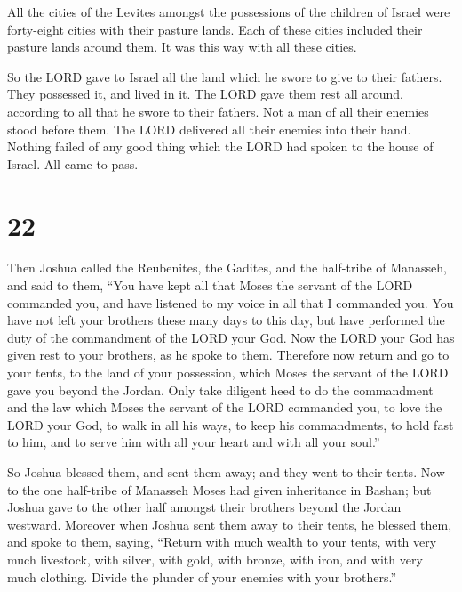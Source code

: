  All the cities of the Levites amongst the possessions of
the children of Israel were forty-eight cities with their pasture lands.
 Each of these cities included their pasture lands around
them. It was this way with all these cities.

 So the LORD gave to Israel all the land which he swore
to give to their fathers. They possessed it, and lived in it.
 The LORD gave them rest all around, according to all
that he swore to their fathers. Not a man of all their enemies stood
before them. The LORD delivered all their enemies into their hand.
 Nothing failed of any good thing which the LORD had
spoken to the house of Israel. All came to pass.

\hypertarget{section-21}{%
\section{22}\label{section-21}}

 Then Joshua called the Reubenites, the Gadites, and the
half-tribe of Manasseh,  and said to them, ``You have kept
all that Moses the servant of the LORD commanded you, and have listened
to my voice in all that I commanded you.  You have not
left your brothers these many days to this day, but have performed the
duty of the commandment of the LORD your God.  Now the
LORD your God has given rest to your brothers, as he spoke to them.
Therefore now return and go to your tents, to the land of your
possession, which Moses the servant of the LORD gave you beyond the
Jordan.  Only take diligent heed to do the commandment and
the law which Moses the servant of the LORD commanded you, to love the
LORD your God, to walk in all his ways, to keep his commandments, to
hold fast to him, and to serve him with all your heart and with all your
soul.''

 So Joshua blessed them, and sent them away; and they went
to their tents.  Now to the one half-tribe of Manasseh
Moses had given inheritance in Bashan; but Joshua gave to the other half
amongst their brothers beyond the Jordan westward. Moreover when Joshua
sent them away to their tents, he blessed them,  and spoke
to them, saying, ``Return with much wealth to your tents, with very much
livestock, with silver, with gold, with bronze, with iron, and with very
much clothing. Divide the plunder of your enemies with your brothers.''

